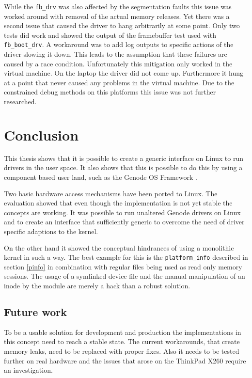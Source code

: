 \documentclass[
a4paper,
12pt,
notitlepage,
parskip=half,
DIV=11,
]{scrbook}
\begin{document}
		While the \texttt{fb\_drv} was also affected by the segmentation faults this issue was worked around with removal of the actual memory releases.
		Yet there was a second issue that caused the driver to hang arbitrarily at some point.
		Only two tests did work and showed the output of the framebuffer test used with \texttt{fb\_boot\_drv}.
		A workaround was to add log outputs to specific actions of the driver slowing it down.
		This leads to the assumption that these failures are caused by a race condition.
		Unfortunately this mitigation only worked in the virtual machine.
		On the laptop the driver did not come up.
		Furthermore it hung at a point that never caused any problems in the virtual machine.
		Due to the constrained debug methods on this platforms this issue was not further researched.
	
	\chapter{Conclusion}
	
		This thesis shows that it is possible to create a generic interface on Linux to run drivers in the user space.
		It also shows that this is possible to do this by using a component based user land, such as the Genode OS Framework \citep{genode}.
		
		Two basic hardware access mechanisms have been ported to Linux.
		The evaluation showed that even though the implementation is not yet stable the concepts are working.
		It was possible to run unaltered Genode drivers on Linux and to create an interface that sufficiently generic to overcome the need of driver specific adaptions to the kernel.
		
		On the other hand it showed the conceptual hindrances of using a monolithic kernel in such a way.
		The best example for this is the \texttt{platform\_info} described in section \ref{pinfo} in combination with regular files being used as read only memory sessions.
		The usage of a symlinked device file and the manual manipulation of an inode by the module are merely a hack than a robust solution.
	
		\section{Future work}
		
		To be a usable solution for development and production the implementations in this concept need to reach a stable state.
		The current workarounds, that create memory leaks, need to be replaced with proper fixes.
		Also it needs to be tested further on real hardware and the issues that arose on the ThinkPad X260 require an investigation.
		
\end{document}
